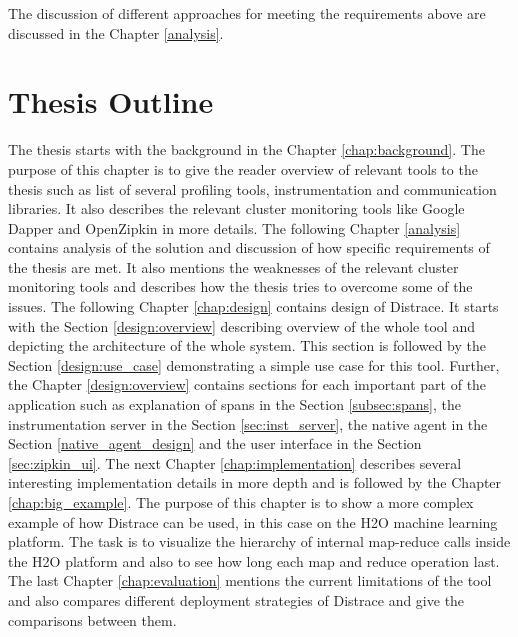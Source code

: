 The discussion of different approaches for meeting the requirements above are discussed in the Chapter \ref{analysis}.

\section{Thesis Outline}
The thesis starts with the background in the Chapter \ref{chap:background}. The purpose of this chapter is to give the reader overview of relevant tools to the thesis such as list of several profiling tools, instrumentation and communication libraries. It also describes the relevant cluster monitoring tools like Google Dapper and OpenZipkin in more details. The following Chapter \ref{analysis} contains analysis of the solution and discussion of how specific requirements of the thesis are met. It also mentions the weaknesses of the relevant cluster monitoring tools and describes how the thesis tries to overcome some of the issues. The following Chapter \ref{chap:design} contains design of Distrace. It starts with the Section \ref{design:overview} describing overview of the whole tool and depicting the architecture of the whole system. This section is followed by the Section \ref{design:use_case} demonstrating a simple use case for this tool. Further, the Chapter \ref{design:overview} contains sections for each important part of the application such as explanation of spans in the Section \ref{subsec:spans}, the instrumentation server in the Section \ref{sec:inst_server}, the native agent in the Section \ref{native_agent_design} and the user interface in the Section \ref{sec:zipkin_ui}. The next Chapter \ref{chap:implementation} describes several interesting implementation details in more depth and is followed by the Chapter \ref{chap:big_example}. The purpose of this chapter is to show a more complex example of how Distrace can be used, in this case on the H2O machine learning platform. The task is to visualize the hierarchy of internal map-reduce calls inside the H2O platform and also to see how long each map and reduce operation last. The last Chapter \ref{chap:evaluation} mentions the current limitations of the tool and also compares different deployment strategies of Distrace and give the comparisons between them.
